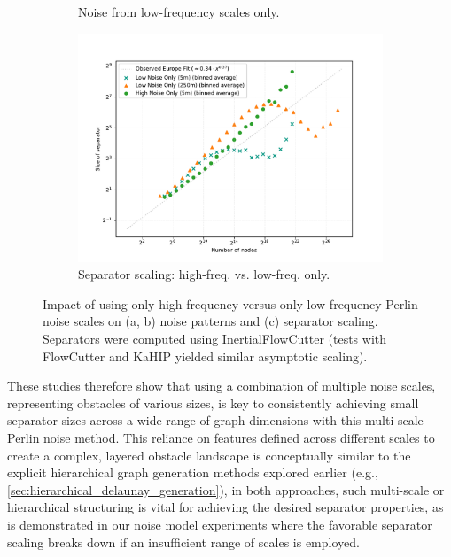 \begin{figure}[tbhp]
\begin{subfigure}[t]{0.25\linewidth}
		\caption{Noise from low-frequency scales only.}
		\label{fig:noise_low_freq_viz}
	\end{subfigure}
	\hfill
	\begin{subfigure}[t]{0.45\linewidth}
		\centering
		\includegraphics[width=\linewidth]{graphics/noise_high_vs_low_only.pdf}
		\caption{Separator scaling: high-freq. vs. low-freq. only.}
		\label{fig:noise_ablation_sep_plot}
	\end{subfigure}
	\caption{Impact of using only high-frequency versus only low-frequency Perlin noise scales on (a, b) noise patterns and (c) separator scaling. Separators were computed using InertialFlowCutter (tests with FlowCutter and KaHIP yielded similar asymptotic scaling).}
	\label{fig:noise_layer_ablation}
\end{figure}

These studies therefore show that using a combination of multiple noise scales, representing obstacles of various sizes, is key to consistently achieving small separator sizes across a wide range of graph dimensions with this multi-scale Perlin noise method.
This reliance on features defined across different scales to create a complex, layered obstacle landscape is conceptually similar to the explicit hierarchical graph generation methods explored earlier (e.g., \cref{sec:hierarchical_delaunay_generation}),
in both approaches, such multi-scale or hierarchical structuring is vital for achieving the desired separator properties, as is demonstrated in our noise model experiments where the favorable separator scaling breaks down if an insufficient range of scales is employed.

